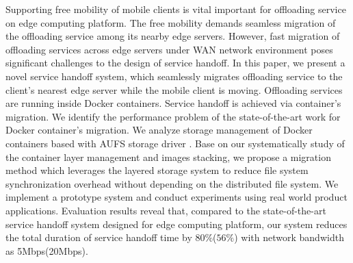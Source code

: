 
Supporting free mobility of mobile clients is vital important for offloading service on edge computing platform. The free mobility demands seamless migration of the offloading service among its nearby edge servers.
% 
However, fast migration of offloading services across edge servers under WAN network environment poses significant challenges to the design of service handoff. 
%
%
%
In this paper, we present a novel service handoff system, which seamlessly migrates offloading service to the client's nearest edge server while the mobile client is moving. Offloading services are running inside Docker containers. Service handoff is achieved via container's migration. 
% 
We identify the performance problem of the state-of-the-art work for Docker container's migration. 
We analyze storage management of Docker containers based with AUFS storage driver .
%
Base on our systematically study of the container layer management and images stacking,
we propose a migration method which leverages the layered storage system to reduce file system synchronization overhead without depending on the distributed file system. 
We implement a prototype system and conduct experiments using real world product applications.
Evaluation results reveal that, compared to the state-of-the-art service handoff system designed for edge computing platform, our system reduces the total duration of service handoff time by 
$80\%$($56\%$) with network bandwidth as 5Mbps(20Mbps).







%
%
%

